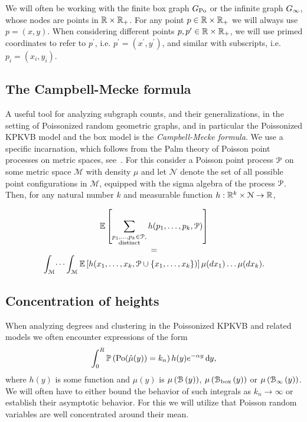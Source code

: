 \begin{remark}
We will often be working with the finite box graph $G_{{\mathrm{Po}}}$ or the infinite graph $G_{\infty}$, whose nodes are points 
in ${\mathbb R} \times {\ensuremath{\mathbb R}}_+$. For any point $p \in {\ensuremath{\mathbb R}} \times {\ensuremath{\mathbb R}}_+$ we will always use $p = (x,y)$. 
When considering different points $p,p^\prime \in {\ensuremath{\mathbb R}} \times {\ensuremath{\mathbb R}}_+$, we will use primed coordinates to refer 
to $p^\prime$, i.e. $p^\prime = (x^\prime ,y^\prime)$, and similar with subscripts, i.e. $p_i = (x_i,y_i)$.
\end{remark}

\subsection{The Campbell-Mecke formula}

A useful tool for analyzing subgraph counts, and their generalizations, in the 
setting of Poissonized random geometric graphs, and in particular the Poissonized KPKVB model and the box 
model is the \emph{Campbell-Mecke formula}. 
We use a specific incarnation, which follows from the Palm theory of Poisson point processes on metric 
spaces, see~\cite{last2017lectures}. For this consider a Poisson point process ${\mathcal P}$ on some metric 
space $\mathcal{M}$ with density $\mu$ and let $\mathcal{N}$ denote the set of all possible point configurations 
in $\mathcal{M}$, equipped with the sigma algebra of the process ${\mathcal P}$. 
Then, for any natural number $k$ and measurable function $h : {\mathbb R}^k \times \mathcal{N} \to {\ensuremath{\mathbb R}}$,

\begin{equation}\label{eq:def_campbell_mecke}
\begin{array}{c}
\displaystyle	\mathbb{E}\left[\sum_{\substack{p_1, \dots, p_k \in {\mathcal P}, \\ \text{distinct}}} h(p_1, \dots, p_k, {\mathcal P})\right] \\
= \\
\displaystyle \int_{\mathcal{M}} \dots \int_{\mathcal{M}} \mathbb{E}\left[h(x_1,\dots, x_k, {\mathcal P}\cup\{x_1,\dots,x_k\})\right] \mu(dx_1)\dots\mu(dx_k).
\end{array}
\end{equation}

\subsection{Concentration of heights}

When analyzing degrees and clustering in the Poissonized KPKVB and related models we often encounter expressions of the form
\begin{equation}\label{eq:example_poisson_integral}
	\int_{0}^R \mathbb{P}\left({\mathrm{Po}}(\hat{\mu}(y)) = k_n\right) h(y) e^{-\alpha y} \operatorname{\mathrm{d}\hspace{-2pt}} y,
\end{equation}
where $h(y)$ is some function and $\hat{\mu}(y)$ is $\mu\left({\mathcal B}\left(y\right)\right)$, $\mu\left({\mathcal B}_{\text{box}}\left(y\right)\right)$ or $\mu\left({\mathcal B}_{\infty}\left(y\right)\right)$. We will often have to either bound the behavior of such integrals as $k_n \to \infty$ or establish their asymptotic behavior. For this we will utilize that Poisson random variables are well concentrated around their mean. 

